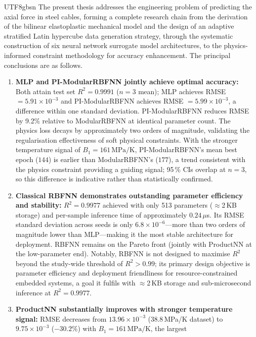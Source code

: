 \documentclass[a4paper,12pt]{report}
\begin{document}
\begin{CJK}{UTF8}{gbsn}
The present thesis addresses the engineering problem of predicting the axial force in
steel cables, forming a complete research chain from the derivation of the bilinear
elastoplastic mechanical model and the design of an adaptive stratified Latin hypercube
data generation strategy, through the systematic construction of six neural network
surrogate model architectures, to the physics-informed constraint methodology for
accuracy enhancement. The principal conclusions are as follows.

\begin{enumerate}
  \item \textbf{MLP and PI-ModularRBFNN jointly achieve optimal accuracy:}
    Both attain test set $R^2 = 0.9991$ ($n=3$ mean); MLP achieves RMSE
    $= 5.91 \times 10^{-3}$ and PI-ModularRBFNN achieves RMSE $= 5.99 \times 10^{-3}$,
    a difference within one standard deviation. PI-ModularRBFNN reduces RMSE by 9.2\%
    relative to ModularRBFNN at identical parameter count. The physics loss decays by
    approximately two orders of magnitude, validating the regularisation effectiveness
    of soft physical constraints. With the stronger temperature signal of
    $B_1 = 161\,\mathrm{MPa/K}$, PI-ModularRBFNN's mean best epoch ($144$) is earlier
    than ModularRBFNN's ($177$), a trend consistent with the physics constraint providing
    a guiding signal; 95\,\% CIs overlap at $n{=}3$, so this difference is indicative
    rather than statistically confirmed.
  \item \textbf{Classical RBFNN demonstrates outstanding parameter efficiency and stability:}
    $R^2 = 0.9977$ achieved with only 513 parameters ($\approx$2\,KB storage) and
    per-sample inference time of approximately $0.24\,\mu$s. Its RMSE standard deviation
    across seeds is only $6.8 \times 10^{-6}$---more than two orders of magnitude lower
    than MLP---making it the most stable architecture for deployment. RBFNN remains on
    the Pareto front (jointly with ProductNN at the low-parameter end).
    Notably, RBFNN is not designed to maximise $R^2$ beyond the study-wide threshold of
    $R^2 > 0.99$; its primary design objective is parameter efficiency and deployment
    friendliness for resource-constrained embedded systems, a goal it fulfils with
    $\approx$2\,KB storage and sub-microsecond inference at $R^2 = 0.9977$.
  \item \textbf{ProductNN substantially improves with stronger temperature signal:}
    RMSE decreases from $13.96 \times 10^{-3}$ (38.8\,MPa/K dataset) to
    $9.75 \times 10^{-3}$ ($-30.2\%$) with $B_1 = 161\,\mathrm{MPa/K}$, the largest

\end{enumerate}
\end{CJK}
\end{document}
